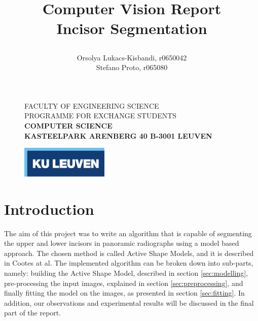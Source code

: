 \documentclass[a4paper]{article}
\title{\vspace*{40.0mm}
    \bf Computer Vision Report\\Incisor Segmentation
    \vspace*{20.0mm} \\
    \vspace*{40.0mm}
\author{
    \Large Orsolya Lukacs-Kisbandi, r0650042 \\
    \Large Stefano Proto, r065080}
}
\makeatletter
\def\cleardoublepage{\clearpage\if@twoside \ifodd\c@page\else%
\hbox{}%
\thispagestyle{empty}%
\clearpage%
\if@twocolumn\hbox{}\clearpage\fi\fi\fi}
\makeatother
\begin{document}
\begin{figure}
    \parbox[t]{125mm}{
        \vspace*{6mm}
        \scriptsize\sf           FACULTY OF ENGINEERING SCIENCE\\
        \scriptsize\sf           PROGRAMME FOR EXCHANGE STUDENTS \\
        \scriptsize\sf\bfseries  COMPUTER SCIENCE \\
        \scriptsize\sf           KASTEELPARK ARENBERG 40 B-3001 LEUVEN}
        \parbox[t]{40mm}{
        \begin{flushright}
            \includegraphics[height=15mm]{logokul.pdf}
        \end{flushright} }
\end{figure}

\maketitle
\thispagestyle{empty}
\raggedbottom

\cleardoublepage
\setcounter{tocdepth}{2}
\cleardoublepage
{}

\maketitle
\thispagestyle{empty}
\newpage
\tableofcontents
\thispagestyle{empty}
\newpage
\setcounter{page}{1}

\section{Introduction}
The aim of this project was to write an algorithm that is capable of segmenting the upper and lower incisors in panoramic radiographs using a model based approach.
The chosen method is called Active Shape Models, and it is described in \cite{cootes} Cootes at al. The implemented algorithm can be broken down into sub-parts, namely: building the Active Shape Model, described in section \ref{sec:modelling}, pre-processing the input images, explained in section \ref{sec:preprocessing}, and finally fitting the model on the images, as presented in section \ref{sec:fitting}. In addition, our observations and experimental results will be discussed in the final part of the report. 
\end{document}
